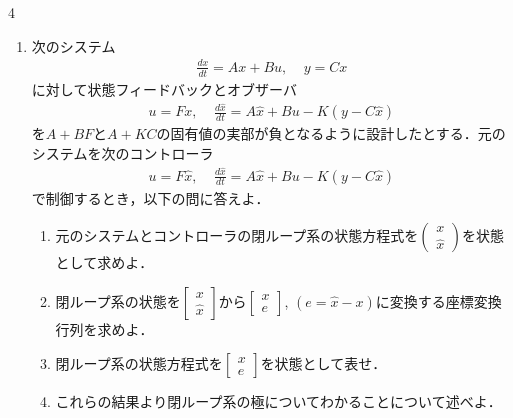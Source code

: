 \documentclass[fleqn]{article}
\renewcommand{\bmatrix}{\left[\begin{array}}
\newcommand{\ematrix}{\end{array}\right]}
\begin{document}
\begin{multicols}{4}
\begin{enumerate}
\begin{enumerate}
\item
このシステムに対して可観測性行列$N^T$がフルランクとならないことを示せ．ただし状態$x$の次数を$n$，$x_1$の次数を$r$とする($x = \bmatrix{c} x_1 \\ x_2 \ematrix \in R^{n}$，$x_1 \in R^{r}$)
\vspace{8cm}
\end{enumerate}



\item 
次のシステム
\begin{align}
	\frac{dx}{dt}=Ax+Bu
	, \ \ \ \ \ 
	y= Cx
\nonumber
\end{align}
に対して状態フィードバックとオブザーバ
\begin{align}
	u = Fx, \ \ \ \ \ 
	\frac{d \hat{x}}{dt} = A \hat{x} + B u - K (y-C\hat{x})
\nonumber
\end{align}
を$A+BF$と$A+KC$の固有値の実部が負となるように設計したとする．元のシステムを次のコントローラ
\begin{align}
	u = F\hat{x}, \ \ \ \ \ 
	\frac{d \hat{x}}{dt} = A \hat{x} + B u - K (y-C\hat{x})
\nonumber
\end{align}
で制御するとき，以下の問に答えよ．
\vfill\null
\columnbreak


\begin{enumerate}
\item 
元のシステムとコントローラの閉ループ系の状態方程式を$\left( \begin{array}{c} x \\ \hat{x} \end{array} \right)$を状態として求めよ．
\vspace{7cm}

\item
閉ループ系の状態を$\bmatrix{c} x \\ \hat{x} \ematrix$から$\bmatrix{c} x \\ e \ematrix$, $ (e= \hat{x}- x) $に変換する座標変換行列を求めよ．
\vspace{3cm}

\item
閉ループ系の状態方程式を$\bmatrix{c} x \\ e \ematrix$を状態として表せ．
\vspace{10cm}

\item
これらの結果より閉ループ系の極についてわかることについて述べよ．
\end{enumerate}




\end{enumerate}
\end{multicols}
\end{document}
